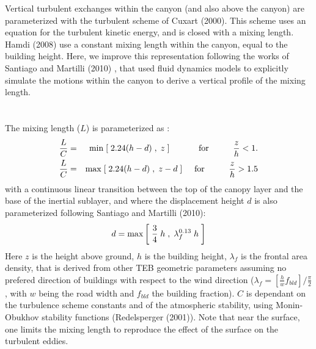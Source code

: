 Vertical turbulent exchanges within the canyon (and also above the canyon) are parameterized 
with the turbulent scheme of Cuxart \etal (2000)\nocite{Cuxart2000}.
This scheme uses an equation for the turbulent 
kinetic energy, and is closed with a mixing length. Hamdi \etal (2008)\nocite{Hamdi2008}
use a constant mixing length within the canyon, equal to the building height. Here, we 
improve this representation following the works of Santiago and Martilli (2010)\nocite{Santiago2010}
, that used fluid dynamics models to explicitly simulate the 
motions within the canyon to derive a vertical profile of the mixing length.\\
\\
\\
The mixing length ($L$) is parameterized as : 
{\footnotesize
\begin{eqnarray}
\frac{L}{C} & = & {\rm min} \; [ \; 2.24 (h-d) \; , \; z \;]   \hspace*{1.2cm} {\rm for} \hspace*{1cm} \frac{z}{h} < 1.    \\
\frac{L}{C} & = & {\rm max} \; [ \; 2.24 (h-d) \; , \; z-d \;] \hspace*{0.5cm} {\rm for} \hspace*{1cm} \frac{z}{h} > 1.5
\end{eqnarray}
}
with a continuous linear transition between the top of the canopy layer and the base of 
the inertial sublayer, and where the displacement height $d$ is also parameterized 
following Santiago and Martilli (2010)\nocite{Santiago2010}:
{\footnotesize
\begin{equation}
d = {\rm max} \left [ \; \frac{3}{4} \; h \; , \; \lambda_f^{0.13} \; h  \; \right ]
\end{equation}
}
Here $z$ is the height above ground, $h$ is the building height, $\lambda_f$ is the frontal 
area density, that is derived from other TEB geometric parameters assuming no prefered direction 
of buildings with respect to the wind direction ($\lambda_f = [\frac{h}{w} f_{bld}] / \frac{\pi}{2}$, 
with $w$ being the road width and $f_{bld}$ the building fraction). $C$ is dependant on the 
turbulence scheme constants and of the atmospheric stability, using Monin-Obukhov stability functions 
(Redelsperger (2001))\nocite{Redelsperger2001}.
Note that near the surface, one limits the mixing length to reproduce the effect of the surface on 
the turbulent eddies. \\


